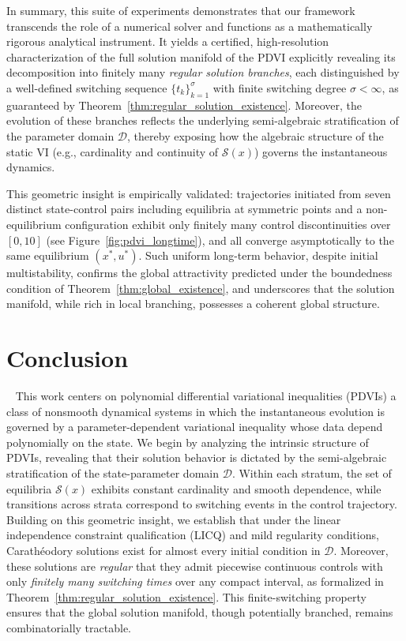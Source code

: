 \documentclass[sn-basic,Numbered]{sn-jnl}
\theoremstyle{thmstyleone}%
\begin{document}
In summary, this suite of experiments demonstrates that our framework transcends the role of a numerical solver and functions as a mathematically rigorous analytical instrument. It yields a certified, high-resolution characterization of the full solution manifold of the PDVI explicitly revealing its decomposition into finitely many \textit{regular solution branches}, each distinguished by a well-defined switching sequence $\{t_k\}_{k=1}^{\sigma}$ with finite switching degree $\sigma < \infty$, as guaranteed by Theorem~\ref{thm:regular_solution_existence}. Moreover, the evolution of these branches reflects the underlying semi-algebraic stratification of the parameter domain $\mathcal{D}$, thereby exposing how the algebraic structure of the static VI (e.g., cardinality and continuity of $\mathcal{S}(x)$) governs the instantaneous dynamics.

This geometric insight is empirically validated: trajectories initiated from seven distinct state-control pairs including equilibria at symmetric points and a non-equilibrium configuration exhibit only finitely many control discontinuities over $[0,10]$ (see Figure~\ref{fig:pdvi_longtime}), and all converge asymptotically to the same equilibrium $(x^*, u^*)$. Such uniform long-term behavior, despite initial multistability, confirms the global attractivity predicted under the boundedness condition of Theorem~\ref{thm:global_existence}, and underscores that the solution manifold, while rich in local branching, possesses a coherent global structure.



\section{Conclusion}~\label{sec:conclusion}
This work centers on polynomial differential variational inequalities (PDVIs) a class of nonsmooth dynamical systems in which the instantaneous evolution is governed by a parameter-dependent variational inequality whose data depend polynomially on the state. We begin by analyzing the intrinsic structure of PDVIs, revealing that their solution behavior is dictated by the semi-algebraic stratification of the state-parameter domain $\mathcal{D}$. Within each stratum, the set of equilibria $\mathcal{S}(x)$ exhibits constant cardinality and smooth dependence, while transitions across strata correspond to switching events in the control trajectory.
Building on this geometric insight, we establish that  under the linear independence constraint qualification (LICQ) and mild regularity conditions, Carath\'{e}odory solutions exist for almost every initial condition in $\mathcal{D}$. Moreover, these solutions are \emph{regular} that they admit piecewise continuous controls with only \emph{finitely many switching times} over any compact interval, as formalized in Theorem~\ref{thm:regular_solution_existence}. This finite-switching property ensures that the global solution manifold, though potentially branched, remains combinatorially tractable.
\end{document}
